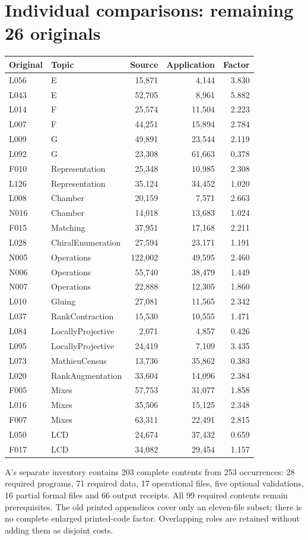 \documentclass[11pt,a4paper]{article}
\begin{document}
\section*{Individual comparisons: remaining 26 originals}
\begin{center}\small\begin{tabular}{llrrr}\toprule
Original & Topic & Source & Application & Factor\\\midrule
L056 & E & 15,871 & 4,144 & 3.830 \\
L043 & E & 52,705 & 8,961 & 5.882 \\
L014 & F & 25,574 & 11,504 & 2.223 \\
L007 & F & 44,251 & 15,894 & 2.784 \\
L009 & G & 49,891 & 23,544 & 2.119 \\
L092 & G & 23,308 & 61,663 & 0.378 \\
F010 & Representation & 25,348 & 10,985 & 2.308 \\
L126 & Representation & 35,124 & 34,452 & 1.020 \\
L008 & Chamber & 20,159 & 7,571 & 2.663 \\
N016 & Chamber & 14,018 & 13,683 & 1.024 \\
F015 & Matching & 37,951 & 17,168 & 2.211 \\
L028 & ChiralEnumeration & 27,594 & 23,171 & 1.191 \\
N005 & Operations & 122,002 & 49,595 & 2.460 \\
N006 & Operations & 55,740 & 38,479 & 1.449 \\
N007 & Operations & 22,888 & 12,305 & 1.860 \\
L010 & Gluing & 27,081 & 11,565 & 2.342 \\
L037 & RankContraction & 15,530 & 10,555 & 1.471 \\
L084 & LocallyProjective & 2,071 & 4,857 & 0.426 \\
L095 & LocallyProjective & 24,419 & 7,109 & 3.435 \\
L073 & MathieuCensus & 13,736 & 35,862 & 0.383 \\
L020 & RankAugmentation & 33,604 & 14,096 & 2.384 \\
F005 & Mixes & 57,753 & 31,077 & 1.858 \\
L016 & Mixes & 35,506 & 15,125 & 2.348 \\
F007 & Mixes & 63,311 & 22,491 & 2.815 \\
L050 & LCD & 24,674 & 37,432 & 0.659 \\
F017 & LCD & 34,082 & 29,454 & 1.157 \\\bottomrule\end{tabular}\end{center}
A's separate inventory contains 203 complete contents from 253 occurrences: 28 required programs, 71 required data, 17 operational files, five optional validations, 16 partial formal files and 66 output receipts. All 99 required contents remain prerequisites. The old printed appendices cover only an eleven-file subset; there is no complete enlarged printed-code factor. Overlapping roles are retained without adding them as disjoint costs.
\end{document}
